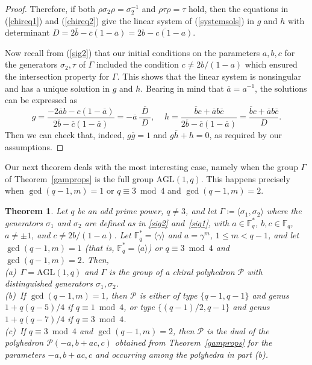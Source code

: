 \documentclass[12pt]{article}
\newtheorem{theorem}{Theorem}[section]
\theoremstyle{definition}\newtheorem{definition}{Definition}[section]
\begin{document}
\begin{proof}
Therefore, if both $\rho \sigma_2\rho = \sigma_2^{-1}$ and $\rho\tau\rho=\tau$ hold, then the equations in (\ref{chireq1}) and (\ref{chireq2}) give the linear system of (\ref{systemsols}) in $g$ and $h$ with determinant $D=2\overline{b}-\overline{c}(1-\overline{a}) = \overline{2b-c(1-a)}$. 

Now recall from (\ref{sig2}) that our initial conditions on the parameters $a,b,c$ for the generators $\sigma_2,\tau$ of $\Gamma$ included the condition $c\neq 2b/(1-a)$ which ensured the intersection property for $\Gamma$. This shows that the linear system is nonsingular and has a unique solution in $g$ and $h$. Bearing in mind that $\overline{a}=a^{-1}$, the solutions can be expressed as 
\[ g=\frac{-2\overline{a}b-c(1-\overline{a})}{2\overline{b}-\overline{c}(1-\overline{a})}=
-\overline{a}\,\frac{\;\overline{D}\;}{\,D\,},
\;\;\;\; h=\frac{\overline{b}c+\overline{a}b\overline{c}}{2\overline{b}-\overline{c}(1-\overline{a})}=\frac{\overline{b}c+\overline{a}b\overline{c}}{D}.\]
Then we can check that, indeed, $g\overline{g}=1$ and $g\overline{h}+h=0$, as required by our assumptions. 
\end{proof}
\bigskip

Our next theorem deals with the most interesting case, namely when the group $\Gamma$ of Theorem~\ref{gamprops} is the full group $\mathrm{AGL}(1,q)$. This happens precisely when $\gcd(q-1,m)=1$ or $q\equiv 3\bmod 4$ and ${\gcd(q-1,m)=2}$.

\begin{theorem}
\label{gampropsagl}
Let $q$ be an odd prime power, $q\neq 3$, and let $\Gamma\coloneqq \langle \sigma_1,\sigma_2\rangle$ where the generators $\sigma_1$ and $\sigma_2$ are defined as in \eqref{sig2} and~\eqref{sig1}, with $a\in\mathbb{F}_q^*$, $b,c\in\mathbb{F}_q$, $a\neq \pm 1$, and $c\neq 2b/(1-a)$. Let $\mathbb{F}_q^*=\langle\gamma\rangle$ and $a=\gamma^m$, $1\leq m<q-1$, and let $\gcd(q-1,m)=1$ (that is, $\mathbb{F}_q^*=\langle a\rangle$) or $q\equiv 3\bmod 4$ and ${\gcd(q-1,m)=2}$. Then, \\[.03in]
(a)\ $\Gamma=\mathrm{AGL}(1,q)$ and $\Gamma$ is the group of a chiral polyhedron $\mathcal{P}$ with distinguished generators $\sigma_1,\sigma_2$. \\[.03in]
(b)\ If $\gcd(q-1,m)=1$, then $\mathcal{P}$ is either of type $\{q-1,q-1\}$ and genus $1+q(q-5)/4$ if $q\equiv 1 \bmod 4$, or type $\{(q-1)/2,q-1\}$ and genus $1+q(q-7)/4$ if $q\equiv 3 \bmod 4$.\\[.03in]
(c)\ If $q\equiv 3\bmod 4$ and ${\gcd(q-1,m)=2}$, then $\mathcal{P}$ is the dual of the polyhedron $\mathcal{P}(-a,b+ac,c)$ obtained from Theorem~\ref{gamprops} for the parameters $-a,b+ac,c$ and occurring among the polyhedra in part (b).
\end{theorem}
\end{document}
